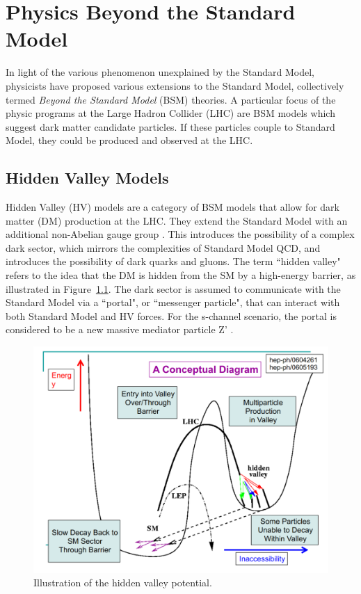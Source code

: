 \chapter{Physics Beyond the Standard Model}
In light of the various phenomenon unexplained by the Standard Model, physicists have proposed various extensions to the Standard Model, collectively termed \textit{Beyond the Standard Model} (BSM) theories. 
A particular focus of the physic programs at the Large Hadron Collider (LHC) are BSM models which suggest dark matter candidate particles. If these particles couple to Standard Model, they could be produced and observed at the LHC.

\section{Hidden Valley Models}
\label{sec:hiddenvalley}

Hidden Valley (HV) models are a category of BSM models that allow for dark matter (DM) production at the LHC. They extend the Standard Model with an additional non-Abelian gauge group \cite{snowmass}. This introduces the possibility of a complex dark sector, which mirrors the complexities of Standard Model QCD, and introduces the possibility of dark quarks and gluons. The term ``hidden valley" refers to the idea that the DM is hidden from the SM by a high-energy barrier, as illustrated in Figure~\ref{fig:hidden_valley_sketch}. The dark sector is assumed to communicate with the Standard Model via a ``portal", or ``messenger particle", that can interact with both Standard Model and HV forces. For the s-channel scenario, the portal is considered to be a new massive mediator particle Z' . \par

\begin{figure}[h]
        \centering
	\includegraphics[width=.5\textwidth]{figures/ch2/hidden_valley_sketch.png}
         \caption{Illustration of the hidden valley potential.
         \label{fig:hidden_valley_sketch}}
\end{figure}

